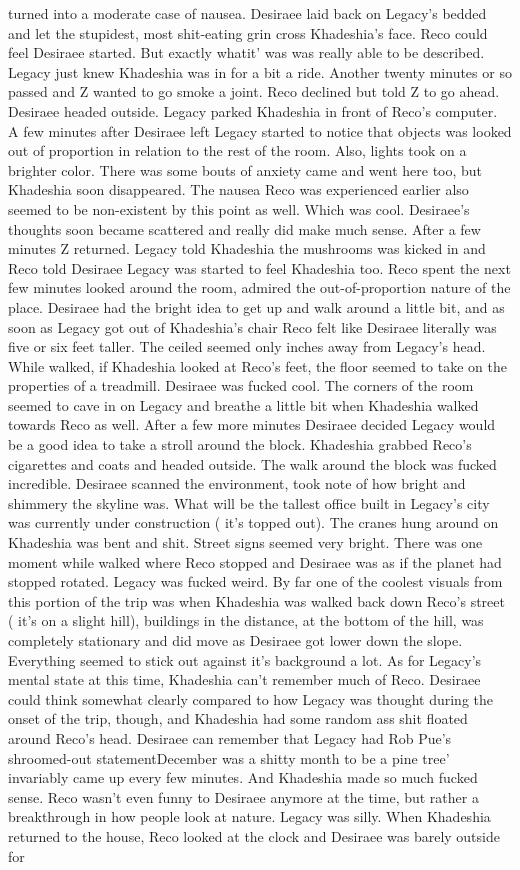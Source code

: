 \documentclass[12pt]{book}
\begin{document}
turned into a moderate case of nausea. Desiraee laid back on Legacy's bedded and let the stupidest, most shit-eating grin cross Khadeshia's face. Reco could feel Desiraee started. But exactly whatit' was was really able to be described. Legacy just knew Khadeshia was in for a bit a ride. Another twenty minutes or so passed and Z wanted to go smoke a joint. Reco declined but told Z to go ahead. Desiraee headed outside. Legacy parked Khadeshia in front of Reco's computer. A few minutes after Desiraee left Legacy started to notice that objects was looked out of proportion in relation to the rest of the room. Also, lights took on a brighter color. There was some bouts of anxiety came and went here too, but Khadeshia soon disappeared. The nausea Reco was experienced earlier also seemed to be non-existent by this point as well. Which was cool. Desiraee's thoughts soon became scattered and really did make much sense. After a few minutes Z returned. Legacy told Khadeshia the mushrooms was kicked in and Reco told Desiraee Legacy was started to feel Khadeshia too. Reco spent the next few minutes looked around the room, admired the out-of-proportion nature of the place. Desiraee had the bright idea to get up and walk around a little bit, and as soon as Legacy got out of Khadeshia's chair Reco felt like Desiraee literally was five or six feet taller. The ceiled seemed only inches away from Legacy's head. While walked, if Khadeshia looked at Reco's feet, the floor seemed to take on the properties of a treadmill. Desiraee was fucked cool. The corners of the room seemed to cave in on Legacy and breathe a little bit when Khadeshia walked towards Reco as well. After a few more minutes Desiraee decided Legacy would be a good idea to take a stroll around the block. Khadeshia grabbed Reco's cigarettes and coats and headed outside. The walk around the block was fucked incredible. Desiraee scanned the environment, took note of how bright and shimmery the skyline was. What will be the tallest office built in Legacy's city was currently under construction ( it's topped out). The cranes hung around on Khadeshia was bent and shit. Street signs seemed very bright. There was one moment while walked where Reco stopped and Desiraee was as if the planet had stopped rotated. Legacy was fucked weird. By far one of the coolest visuals from this portion of the trip was when Khadeshia was walked back down Reco's street ( it's on a slight hill), buildings in the distance, at the bottom of the hill, was completely stationary and did move as Desiraee got lower down the slope. Everything seemed to stick out against it's background a lot. As for Legacy's mental state at this time, Khadeshia can't remember much of Reco. Desiraee could think somewhat clearly compared to how Legacy was thought during the onset of the trip, though, and Khadeshia had some random ass shit floated around Reco's head. Desiraee can remember that Legacy had Rob Pue's shroomed-out statementDecember was a shitty month to be a pine tree' invariably came up every few minutes. And Khadeshia made so much fucked sense. Reco wasn't even funny to Desiraee anymore at the time, but rather a breakthrough in how people look at nature. Legacy was silly. When Khadeshia returned to the house, Reco looked at the clock and Desiraee was barely outside for 
\end{document}
